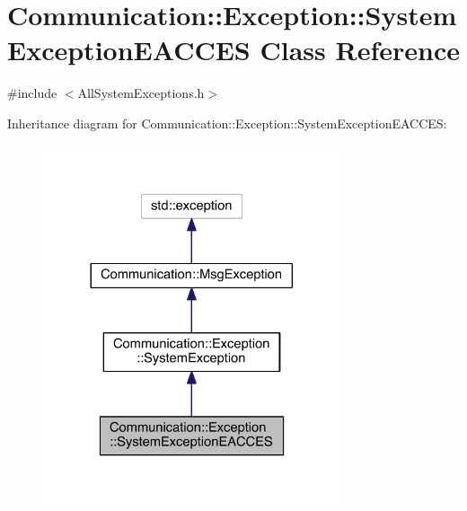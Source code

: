 \hypertarget{class_communication_1_1_exception_1_1_system_exception_e_a_c_c_e_s}{}\section{Communication\+:\+:Exception\+:\+:System\+Exception\+E\+A\+C\+C\+E\+S Class Reference}
\label{class_communication_1_1_exception_1_1_system_exception_e_a_c_c_e_s}


{\ttfamily \#include $<$All\+System\+Exceptions.\+h$>$}



Inheritance diagram for Communication\+:\+:Exception\+:\+:System\+Exception\+E\+A\+C\+C\+E\+S\+:\nopagebreak
\begin{figure}[H]
\begin{center}
\leavevmode
\includegraphics[width=248pt]{class_communication_1_1_exception_1_1_system_exception_e_a_c_c_e_s__inherit__graph}
\end{center}
\end{figure}


